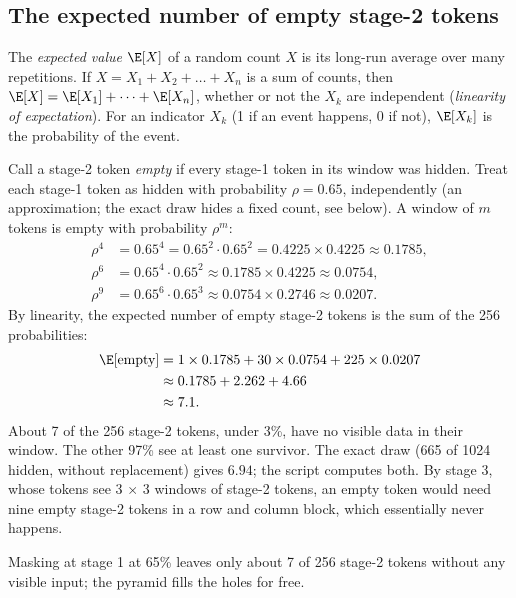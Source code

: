 \subsection{The expected number of empty stage-2 tokens}

\begin{definition}
The \emph{expected value} $\E[X]$ of a random count $X$ is its long-run average
over many repetitions. If $X = X_1 + X_2 + \dots + X_n$ is a sum of counts, then
$\E[X] = \E[X_1] + \dots + \E[X_n]$, whether or not the $X_k$ are independent
(\emph{linearity of expectation}). For an indicator $X_k$ (1 if an event
happens, 0 if not), $\E[X_k]$ is the probability of the event.
\end{definition}

Call a stage-2 token \emph{empty} if every stage-1 token in its window was hidden. Treat each stage-1
token as hidden with probability $\rho = 0.65$, independently (an approximation; the exact draw hides a
fixed count, see below). A window of $m$ tokens is empty with probability $\rho^m$:
\begin{align*}
\rho^4 &= 0.65^4 = 0.65^2 \cdot 0.65^2 = 0.4225 \times 0.4225 \approx 0.1785,\\
\rho^6 &= 0.65^4 \cdot 0.65^2 \approx 0.1785 \times 0.4225 \approx 0.0754,\\
\rho^9 &= 0.65^6 \cdot 0.65^3 \approx 0.0754 \times 0.2746 \approx 0.0207 .
\end{align*}
By linearity, the expected number of empty stage-2 tokens is the sum of the 256 probabilities:
\begin{align*}
\E[\text{empty}] &= 1 \times 0.1785 + 30 \times 0.0754 + 225 \times 0.0207\\
                 &\approx 0.1785 + 2.262 + 4.66\\
                 &\approx 7.1 .
\end{align*}
About 7 of the 256 stage-2 tokens\tagC, under 3\%, have no visible data in their window. The other 97\%
see at least one survivor. The exact draw (665 of 1024 hidden, without replacement) gives $6.94$; the
script  computes both\tagC. By stage 3, whose tokens
see 3 $\times$ 3 windows of stage-2 tokens, an empty token would need nine empty stage-2 tokens in a
row and column block, which essentially never happens.

\begin{keypoint}
Masking at stage 1 at 65\% leaves only about 7 of 256 stage-2 tokens without any visible input; the
pyramid fills the holes for free.
\end{keypoint}

